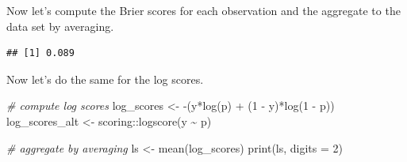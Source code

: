 \documentclass[
]{book}
\newenvironment{Shaded}{\begin{snugshade}}{\end{snugshade}}
\newcommand{\AttributeTok}[1]{\textcolor[rgb]{0.77,0.63,0.00}{#1}}
\newcommand{\CommentTok}[1]{\textcolor[rgb]{0.56,0.35,0.01}{\textit{#1}}}
\newcommand{\DecValTok}[1]{\textcolor[rgb]{0.00,0.00,0.81}{#1}}
\newcommand{\FunctionTok}[1]{\textcolor[rgb]{0.00,0.00,0.00}{#1}}
\newcommand{\NormalTok}[1]{#1}
\newcommand{\OtherTok}[1]{\textcolor[rgb]{0.56,0.35,0.01}{#1}}
\newcommand{\SpecialCharTok}[1]{\textcolor[rgb]{0.00,0.00,0.00}{#1}}
\newcommand{\StringTok}[1]{\textcolor[rgb]{0.31,0.60,0.02}{#1}}
\begin{document}
Now let's compute the Brier scores for each observation and the aggregate to the data set by averaging.

\begin{Shaded}
\end{Shaded}

\begin{verbatim}
## [1] 0.089
\end{verbatim}

Now let's do the same for the log scores.

\begin{Shaded}
\begin{Highlighting}[]
\CommentTok{\# compute log scores}
\NormalTok{log\_scores }\OtherTok{\textless{}{-}} \SpecialCharTok{{-}}\NormalTok{(y}\SpecialCharTok{*}\FunctionTok{log}\NormalTok{(p) }\SpecialCharTok{+}\NormalTok{ (}\DecValTok{1} \SpecialCharTok{{-}}\NormalTok{ y)}\SpecialCharTok{*}\FunctionTok{log}\NormalTok{(}\DecValTok{1} \SpecialCharTok{{-}}\NormalTok{ p))}
\NormalTok{log\_scores\_alt }\OtherTok{\textless{}{-}}\NormalTok{ scoring}\SpecialCharTok{::}\FunctionTok{logscore}\NormalTok{(y }\SpecialCharTok{\textasciitilde{}}\NormalTok{ p)}

\CommentTok{\# aggregate by averaging}
\NormalTok{ls }\OtherTok{\textless{}{-}} \FunctionTok{mean}\NormalTok{(log\_scores)}
\FunctionTok{print}\NormalTok{(ls, }\AttributeTok{digits =} \DecValTok{2}\NormalTok{)}
\end{Highlighting}
\end{Shaded}
\end{document}
